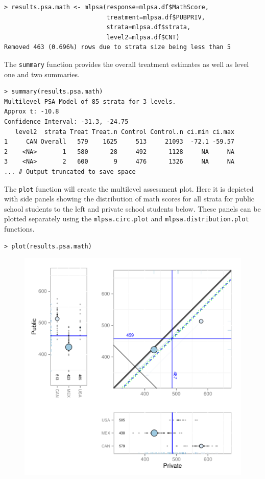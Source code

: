 \documentclass[letterpaper,12p,twoside]{article} %
\begin{document}
\begin{verbatim}
> results.psa.math <- mlpsa(response=mlpsa.df$MathScore, 
                            treatment=mlpsa.df$PUBPRIV, 
                            strata=mlpsa.df$strata, 
                            level2=mlpsa.df$CNT)
Removed 463 (0.696%) rows due to strata size being less than 5
\end{verbatim}

\noindent The \texttt{summary} function provides the overall treatment estimates as well as level one and two summaries.

\begin{verbatim}
> summary(results.psa.math)
Multilevel PSA Model of 85 strata for 3 levels.
Approx t: -10.8
Confidence Interval: -31.3, -24.75
   level2  strata Treat Treat.n Control Control.n ci.min ci.max
1     CAN Overall   579    1625     513     21093  -72.1 -59.57
2    <NA>       1   580      28     492      1128     NA     NA
3    <NA>       2   600       9     476      1326     NA     NA
... # Output truncated to save space
\end{verbatim}

\noindent The \texttt{plot} function will create the multilevel assessment plot. Here it is depicted with side panels showing the distribution of math scores for all strata for public school students to the left and private school students below. These panels can be plotted separately using the \texttt{mlpsa.circ.plot} and \texttt{mlpsa.distribution.plot} functions.

\begin{verbatim}
> plot(results.psa.math)
\end{verbatim}

\begin{figure}[h!]
\begin{center}
\includegraphics[width=\textwidth]{../Figures/pisamlpsa.pdf}
\end{center}
\end{figure}
\end{document}
